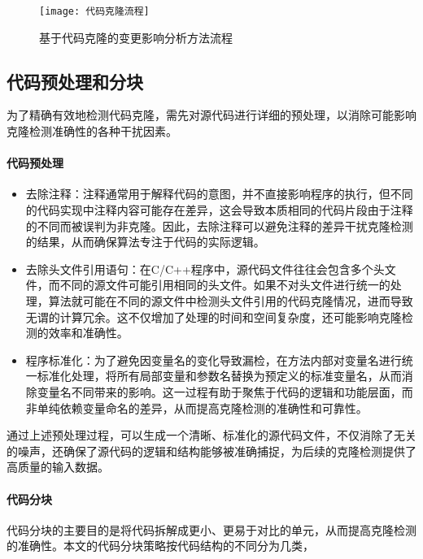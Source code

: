 \begin{figure}[h]
\centering
\texttt{[image: 代码克隆流程]}
\caption{基于代码克隆的变更影响分析方法流程}
\end{figure}



\subsection{代码预处理和分块}

为了精确有效地检测代码克隆，需先对源代码进行详细的预处理，以消除可能影响克隆检测准确性的各种干扰因素。

\paragraph{代码预处理}

\begin{itemize}
    \item 去除注释：注释通常用于解释代码的意图，并不直接影响程序的执行，但不同的代码实现中注释内容可能存在差异，这会导致本质相同的代码片段由于注释的不同而被误判为非克隆。因此，去除注释可以避免注释的差异干扰克隆检测的结果，从而确保算法专注于代码的实际逻辑。
    
    \item 去除头文件引用语句：在C/C++程序中，源代码文件往往会包含多个头文件，而不同的源文件可能引用相同的头文件。如果不对头文件进行统一的处理，算法就可能在不同的源文件中检测头文件引用的代码克隆情况，进而导致无谓的计算冗余。这不仅增加了处理的时间和空间复杂度，还可能影响克隆检测的效率和准确性。
    
    \item 程序标准化：为了避免因变量名的变化导致漏检，在方法内部对变量名进行统一标准化处理，将所有局部变量和参数名替换为预定义的标准变量名，从而消除变量名不同带来的影响。这一过程有助于聚焦于代码的逻辑和功能层面，而非单纯依赖变量命名的差异，从而提高克隆检测的准确性和可靠性。

\end{itemize}

通过上述预处理过程，可以生成一个清晰、标准化的源代码文件，不仅消除了无关的噪声，还确保了源代码的逻辑和结构能够被准确捕捉，为后续的克隆检测提供了高质量的输入数据。


\paragraph{代码分块}

代码分块的主要目的是将代码拆解成更小、更易于对比的单元，从而提高克隆检测的准确性。本文的代码分块策略按代码结构的不同分为几类，


